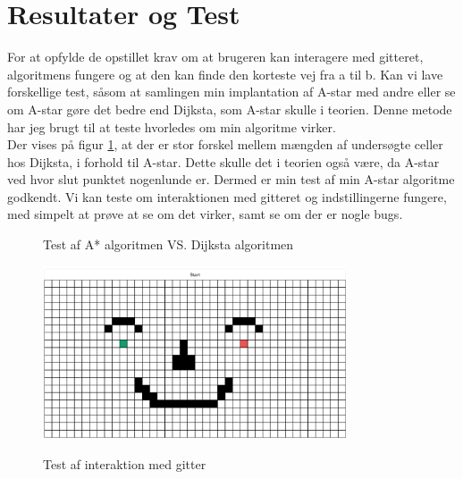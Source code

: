 \documentclass[12pt]{article}
\begin{document}
\section{Resultater og Test}
For at opfylde de opstillet krav om at brugeren kan interagere med gitteret, algoritmens fungere og at den kan finde den korteste vej fra a til b. Kan vi lave forskellige test, såsom at samlingen min implantation af A-star med andre eller se om A-star gøre det bedre end Dijksta, som A-star skulle i teorien. Denne metode har jeg brugt til at teste hvorledes om min algoritme virker. \\
Der vises på figur \ref{fig:testAlgortime}, at der er stor forskel mellem mængden af undersøgte celler hos Dijksta, i forhold til A-star. Dette skulle det i teorien også være, da A-star ved hvor slut punktet nogenlunde er. Dermed er min test af min A-star algoritme godkendt. 
Vi kan teste om interaktionen med gitteret og indstillingerne fungere, med simpelt at prøve at se om det virker, samt se om der er nogle bugs.
\begin{figure}[ht]
  \centering
  \caption{Test af A* algoritmen VS. Dijksta algoritmen}\label{fig:testAlgortime}
\end{figure}
\begin{figure}[ht]
  \centering
  {\includegraphics[width=9cm]{../AppPreview2.PNG} }%
  \caption{Test af interaktion med gitter}\label{fig:testInteraktion}
\end{figure}
\end{document}
